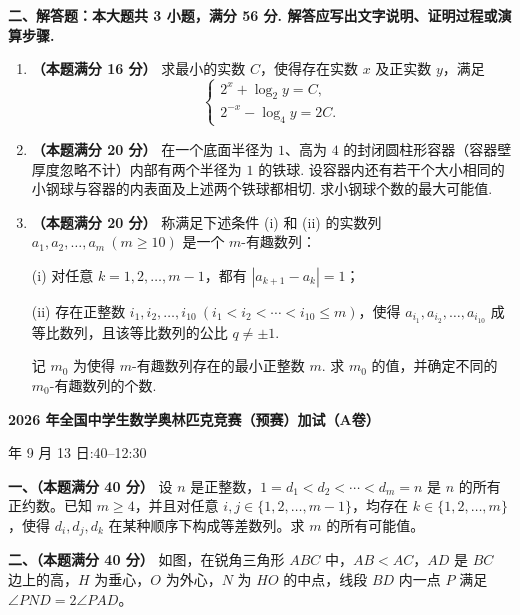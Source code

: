 \documentclass[UTF8,10pt]{ctexart}
\newcommand{\score}[1]{\textbf{（本题满分 #1 分）}}
\newcommand{\problemsep}{\par\addvspace{9pt}}
\begin{document}
\vspace{1pt}
\noindent\textbf{二、解答题：本大题共 3 小题，满分 56 分. 解答应写出文字说明、证明过程或演算步骤.}
\begin{enumerate}[label=\textbf{\arabic*.},start=9,itemsep=10pt]
  \item \score{16} 求最小的实数 $C$，使得存在实数 $x$ 及正实数 $y$，满足
  \[
    \begin{cases}
      2^x+\log_2y=C,\\[-1pt]
      2^{-x}-\log_4y=2C.
    \end{cases}
  \]

  \item \score{20} 在一个底面半径为 $1$、高为 $4$ 的封闭圆柱形容器（容器壁厚度忽略不计）内部有两个半径为 $1$ 的铁球. 设容器内还有若干个大小相同的小钢球与容器的内表面及上述两个铁球都相切. 求小钢球个数的最大可能值.

  \item \score{20} 称满足下述条件 (i) 和 (ii) 的实数列 $a_1,a_2,\ldots,a_m\ (m\geqslant10)$ 是一个 {\kaishu $m$-有趣数列}：

  \hspace{1em}(i) 对任意 $k=1,2,\ldots,m-1$，都有 $|a_{k+1}-a_k|=1$；

  \hspace{1em}(ii) 存在正整数 $i_1,i_2,\ldots,i_{10}\ (i_1<i_2<\cdots<i_{10}\leqslant m)$，使得
  $a_{i_1},a_{i_2},\ldots,a_{i_{10}}$ 成等比数列，且该等比数列的公比 $q\ne\pm1$.

  记 $m_0$ 为使得 $m$-有趣数列存在的最小正整数 $m$. 求 $m_0$ 的值，并确定不同的 $m_0$-有趣数列的个数.
\end{enumerate}

\newpage
\fontsize{12.8pt}{21pt}\selectfont
\begin{center}
  {\fontsize{17.28pt}{21pt}\selectfont\bfseries 2026 年全国中学生数学奥林匹克竞赛（预赛）加试（A卷）\par}
  \vspace{2pt}
  { 年 9 月 13 日}:40--12:30
\end{center}
\vspace{5pt}

\noindent\textbf{一、（本题满分 40 分）}\quad
设 $n$ 是正整数，$1=d_1<d_2<\cdots<d_m=n$ 是 $n$ 的所有正约数。已知 $m\geqslant4$，并且对任意
$i,j\in\{1,2,\ldots,m-1\}$，均存在 $k\in\{1,2,\ldots,m\}$，使得 $d_i,d_j,d_k$ 在某种顺序下构成等差数列。求 $m$ 的所有可能值。
\problemsep
\noindent\textbf{二、（本题满分 40 分）}\quad
如图，在锐角三角形 $ABC$ 中，$AB<AC$，$AD$ 是 $BC$ 边上的高，$H$ 为垂心，$O$ 为外心，$N$ 为 $HO$ 的中点，线段 $BD$ 内一点 $P$ 满足 $\angle PND=2\angle PAD$。
\end{document}
